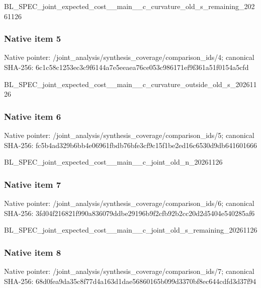 \documentclass[10pt,a4paper]{article}
\begin{document}
BL\_SPEC\_joint\_expected\_c\allowbreak{}ost\_\_main\_\_c\_curvature\_o\allowbreak{}ld\_s\_remaining\_20261126


\subsubsection{Native item 5}


Native pointer: /joint\_analysis/synthesi\allowbreak{}s\_coverage/comparison\_id\allowbreak{}s/4; canonical SHA-256: 6c1c58c1253ec3c9f6144a7e\allowbreak{}5eeaea76ce053c986171ef9f\allowbreak{}361a51f0154a5cfd


BL\_SPEC\_joint\_expected\_c\allowbreak{}ost\_\_main\_\_c\_curvature\_o\allowbreak{}utside\_old\_s\_20261126


\subsubsection{Native item 6}


Native pointer: /joint\_analysis/synthesi\allowbreak{}s\_coverage/comparison\_id\allowbreak{}s/5; canonical SHA-256: fc5b4ad329b6bb4e06961fbd\allowbreak{}b76bfe3cf9c15f1be2ed16c6\allowbreak{}530d9db641601666


BL\_SPEC\_joint\_expected\_c\allowbreak{}ost\_\_main\_\_c\_joint\_old\_n\allowbreak{}\_20261126


\subsubsection{Native item 7}


Native pointer: /joint\_analysis/synthesi\allowbreak{}s\_coverage/comparison\_id\allowbreak{}s/6; canonical SHA-256: 3fd04f216821f990a836079d\allowbreak{}dbe29196b9f2cfb92b2cc20d\allowbreak{}2d5404e540285af6


BL\_SPEC\_joint\_expected\_c\allowbreak{}ost\_\_main\_\_c\_joint\_old\_s\allowbreak{}\_remaining\_20261126


\subsubsection{Native item 8}


Native pointer: /joint\_analysis/synthesi\allowbreak{}s\_coverage/comparison\_id\allowbreak{}s/7; canonical SHA-256: 68d0fea9da35c8f77d4a163d\allowbreak{}1dae56860165b099d3370bf8\allowbreak{}ec644cdfd3d37f94
\end{document}
